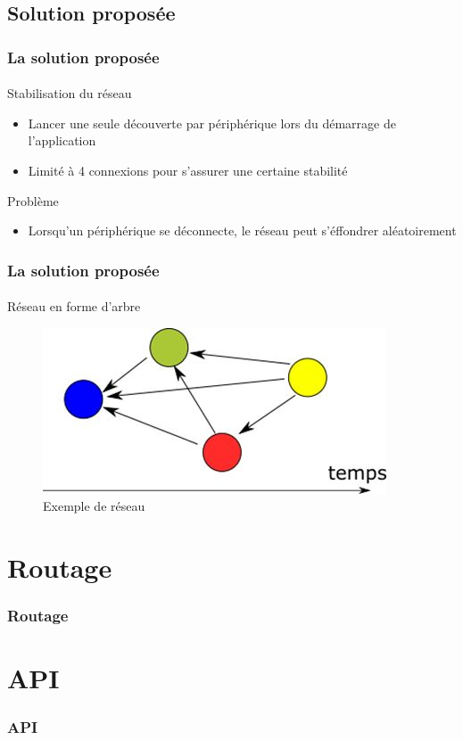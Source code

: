 \documentclass{beamer}
\begin{document}
    \subsection{Solution proposée}
    \begin{frame}
      \frametitle{La solution proposée}
      \framesubtitle{}
      \begin{block}{Stabilisation du réseau}
        \begin{itemize}
          \item Lancer une seule découverte par périphérique lors du démarrage de l'application
          \item Limité à 4 connexions pour s'assurer une certaine stabilité
        \end{itemize}
      \end{block}
      \begin{block}{Problème}
        \begin{itemize}
          \item Lorsqu'un périphérique se déconnecte, le réseau peut s'éffondrer aléatoirement
        \end{itemize}
      \end{block}
    \end{frame}
    \begin{frame}
      \frametitle{La solution proposée}
      \framesubtitle{}
      \begin{block}{Réseau en forme d'arbre}
        \begin{figure}
          \begin{center}
            \includegraphics[width=.5\textwidth]{images/auto.png}
            \caption{Exemple de réseau}
            \label{fig:auto}
          \end{center}
        \end{figure}
      \end{block}
    \end{frame}

  \section{Routage}
  \begin{frame}
    \frametitle{Routage}
    \framesubtitle{}
  
  \end{frame}
  
  \section{API}
  \begin{frame}
    \frametitle{API}
    \framesubtitle{}
  
  \end{frame}
  
  
\end{document}
